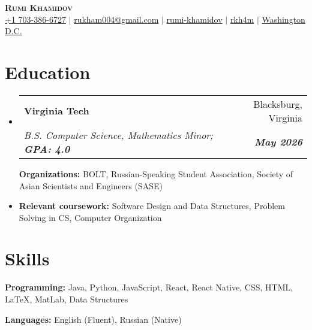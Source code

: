 \documentclass[letterpaper, 9pt]{article}
\makeatletter
\newcommand{\resumeItem}[1]{
  \item\small{
    {#1 \vspace{-2pt}}
  }
}
\newcommand{\resumeEducationHeading}[6]{
  \vspace{-2pt}\item
    \begin{tabular*}{0.97\textwidth}[t]{l@{\extracolsep{\fill}}r}
      \textbf{#1} & #2 \\
      \textit{\small#3} & \textit{\small #4} \\
    \end{tabular*}\vspace{-5pt}
}
\newcommand{\resumeSubHeadingListStart}{\begin{itemize}[leftmargin=0.15in, label={}]}
\newcommand{\resumeSubHeadingListEnd}{\end{itemize}}
\newcommand{\resumeItemListStart}{\begin{itemize}}
\newcommand{\resumeItemListEnd}{\end{itemize}\vspace{-5pt}}
\makeatother
\begin{document}

\begin{center}
    \textbf{\Huge \scshape Rumi Khamidov} \\ \vspace{3pt}
    \small
    \faMobile \hspace{.5pt} \href{tel:7033866727}{+1 703-386-6727}
    $|$
    \faAt \hspace{.5pt} \href{mailto:rukham004@gmail.com}{rukham004@gmail.com}
    $|$
    \faLinkedinSquare \hspace{.5pt} \href{https://www.linkedin.com/in/rumi-khamidov-22b622290/}{rumi-khamidov}
    $|$
    \faGithub \hspace{.5pt} \href{https://github.com/rkh4m}{rkh4m}
    $|$
    \faMapMarker \hspace{.5pt} \href{https://maps.app.goo.gl/aoi52DAKhQkgQ1MT8}{Washington D.C.}
\end{center}



\section{Education}
  \vspace{3pt}
  \resumeSubHeadingListStart
    
    \resumeEducationHeading
      {Virginia Tech
      }{Blacksburg, Virginia}
      {B.S. Computer Science, Mathematics Minor; \textbf{GPA: 4.0}}{\textbf{May 2026}}

        \resumeItemListStart
	   \resumeItem{\textbf{Organizations:} BOLT, Russian-Speaking Student Association, Society of Asian Scientists and Engineers (SASE)}
             \resumeItem{\textbf{Relevant coursework:} Software Design and Data Structures, Problem Solving in CS, Computer Organization}
         \resumeItemListEnd


\section{Skills}
  \vspace{2pt}
  \resumeSubHeadingListStart
    \small{\item{
        \textbf{Programming:}{ Java, Python, JavaScript, React, React Native, CSS, HTML, LaTeX, MatLab, Data Structures} \\ \vspace{3pt}
                
        \textbf{Languages:}{ English (Fluent), Russian (Native)}
    }}
  \resumeSubHeadingListEnd
\end{document}
